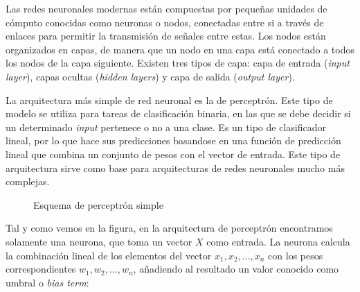 \documentclass[11pt,spanish,listoffigures,listoftables]{tfgetsinf}
\begin{document}
Las redes neuronales modernas están compuestas por pequeñas unidades de cómputo conocidas como neuronas o nodos, conectadas entre si a través de enlaces para permitir la transmisión de señales entre estas. Los nodos están organizados en capas, de manera que un nodo en una capa está conectado a todos los nodos de la capa siguiente. Existen tres tipos de capa: capa de entrada (\textit{input layer}), capas ocultas (\textit{hidden layers}) y capa de salida (\textit{output layer}). 

La arquitectura más simple de red neuronal es la de perceptrón. Este tipo de modelo se utiliza para tareas de clasificación binaria, en las que se debe decidir si un determinado \textit{input} pertenece o no a una clase. Es un tipo de clasificador lineal, por lo que hace sus predicciones basandose en una función de predicción lineal que combina un conjunto de pesos con el vector de entrada. Este tipo de arquitectura sirve como base para arquitecturas de redes neuronales mucho más complejas.

\begin{figure}[h]
	\centering
	\caption{Esquema de perceptrón simple}
\end{figure}


Tal y como vemos en la figura, en la arquitectura de perceptrón encontramos solamente una neurona, que toma un vector $X$ como entrada. La neurona calcula la combinación lineal de los elementos del vector $x_1, x_2, ..., x_n$ con los pesos correspondientes $w_1, w_2, ..., w_n$, añadiendo al resultado un valor conocido como umbral o \textit{bias term}:
\end{document}
